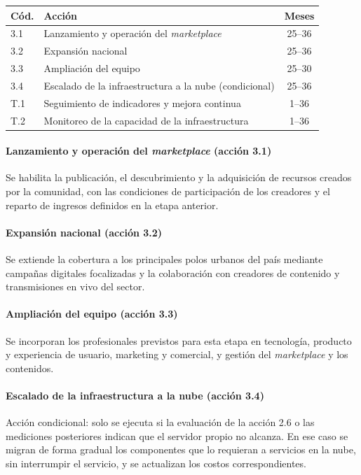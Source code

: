\begin{center}
\small
\begin{tabularx}{\textwidth}{|l|X|c|}
\hline
\textbf{Cód.} & \textbf{Acción} & \textbf{Meses}\\ \hline
3.1 & Lanzamiento y operación del \textit{marketplace} & 25--36\\ \hline
3.2 & Expansión nacional & 25--36\\ \hline
3.3 & Ampliación del equipo & 25--30\\ \hline
3.4 & Escalado de la infraestructura a la nube (condicional) & 25--36\\ \hline
T.1 & Seguimiento de indicadores y mejora continua & 1--36\\ \hline
T.2 & Monitoreo de la capacidad de la infraestructura & 1--36\\ \hline
\end{tabularx}
\end{center}

\paragraph{Lanzamiento y operación del \textit{marketplace} (acción 3.1)}
Se habilita la publicación, el descubrimiento y la adquisición de recursos creados por la comunidad, con las condiciones de participación de los creadores y el reparto de ingresos definidos en la etapa anterior.

\paragraph{Expansión nacional (acción 3.2)}
Se extiende la cobertura a los principales polos urbanos del país mediante campañas digitales focalizadas y la colaboración con creadores de contenido y transmisiones en vivo del sector.

\paragraph{Ampliación del equipo (acción 3.3)}
Se incorporan los profesionales previstos para esta etapa en tecnología, producto y experiencia de usuario, marketing y comercial, y gestión del \textit{marketplace} y los contenidos.

\paragraph{Escalado de la infraestructura a la nube (acción 3.4)}
Acción condicional: solo se ejecuta si la evaluación de la acción 2.6 o las mediciones posteriores indican que el servidor propio no alcanza. En ese caso se migran de forma gradual los componentes que lo requieran a servicios en la nube, sin interrumpir el servicio, y se actualizan los costos correspondientes.

